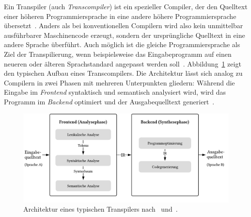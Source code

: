 Ein Transpiler (auch \textit{Transcompiler}) ist ein spezieller Compiler, der den Quelltext einer höheren Programmiersprache in eine andere höhere Programmiersprache übersetzt~\autocite[3]{AHO:COMPILERS}. Anders als bei konventionellen Compilern wird also kein unmittelbar ausführbarer Maschinencode erzeugt, sondern der ursprüngliche Quelltext in eine andere Sprache überführt. Auch möglich ist die gleiche Programmiersprache als Ziel der Transpilierung, wenn beispielsweise das Eingabeprogramm auf einen neueren oder älteren Sprachstandard angepasst werden soll~\autocite{EVGENIY:2016}.
Abbildung~\ref{fig:transpiler-architecture} zeigt den typischen Aufbau eines Transcompilers. Die Architektur lässt sich analog zu Compilern in zwei Phasen mit mehreren Unterpunkten gliedern: Während die Eingabe im \emph{Frontend} syntaktisch und semantisch analysiert wird, wird das Programm im \emph{Backend} optimiert und der Ausgabequelltext generiert~\autocite[136]{APPEL:2003}.

\begin{figure}[htb]
  \includegraphics[width=\textwidth]{src/2_Grundlagen/fig/transpiler-architecture.pdf}
  \caption{Architektur eines typischen Transpilers nach~\autocite{EVGENIY:2016} und~\autocite[8]{TORCZON:2007}.}
	\label{fig:transpiler-architecture}
\end{figure}

